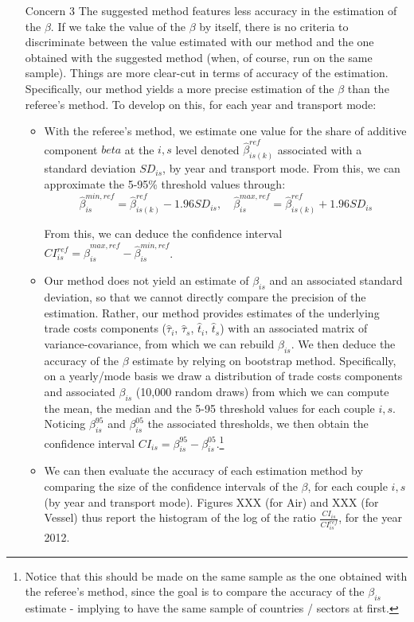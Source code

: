 \documentclass[a4paper,12pt]{article}
\begin{document}
\begin{itemize}
\item[Concern 3] The suggested method features less accuracy in the estimation of the $\beta$. If we take the value of the $\beta$ by itself, there is no criteria to discriminate between the value estimated with our method and the one obtained with the suggested method (when, of course, run on the same sample). Things are more clear-cut in terms of accuracy of the estimation. Specifically, our method yields a more precise estimation of the $\beta$ than the referee's method. To develop on this, for each year and transport mode:
    \begin{itemize}
    \item With the referee's method, we estimate one value for the share of additive component $beta$ at the $i,s$ level denoted $\hat{\beta}^{ref}_{is(k)}$ associated with a standard deviation $SD_{is}$, by year and transport mode. From this, we can approximate the 5-95\% threshold values through:
        $$\hat{\beta}_{is}^{min,ref} = \hat{\beta}^{ref}_{is(k)} - 1.96 SD_{is},\quad \hat{\beta}_{is}^{max,ref} = \hat{\beta}^{ref}_{is(k)} + 1.96 SD_{is}$$

        From this, we can deduce the confidence interval $CI^{ref}_{is} = \hat{\beta}_{is}^{max,ref} - \hat{\beta}_{is}^{min,ref}$.

    \item  Our method does not yield an estimate of $\beta_{is}$ and an associated standard deviation, so that we cannot directly compare the precision of the estimation. Rather, our method provides estimates of the underlying trade costs components ($\widehat{\tau}_i$, $\widehat{\tau}_s$, $\widehat{t}_i$, $\widehat{t}_s$) with an associated matrix of variance-covariance, from which we can rebuild $\beta_{is}$. We then deduce the accuracy of the $\beta$ estimate by relying on bootstrap method. Specifically, on a yearly/mode basis we draw a distribution of trade costs components and associated $\beta_{is}$ (10,000 random draws) from which we can compute the mean, the median and the 5-95 threshold values for each couple $i,s$. Noticing $\beta_{is}^{95}$ and $\beta_{is}^{05}$ the associated thresholds, we then obtain the confidence interval $CI_{is}= \beta_{is}^{95}- \beta_{is}^{05}$.\footnote{Notice that this should be made on the same sample as the one obtained with the referee's method, since the goal is to compare the accuracy of the $\beta_{is}$ estimate - implying to have the same sample of countries / sectors at first. }

    \item We can then evaluate the accuracy of each estimation method by comparing the size of the confidence intervals of the $\beta$, for each couple $i,s$ (by year and transport mode). Figures XXX (for Air) and XXX (for Vessel) thus report the histogram of the log of the ratio $\frac{CI_{is}}{CI^{ref}_{is}}$, for the year 2012.



\end{itemize}
\end{itemize}
\end{document}
